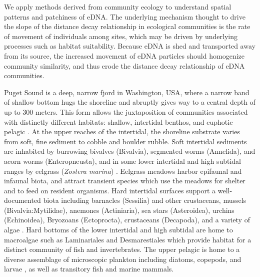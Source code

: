 \documentclass[11pt,letterpaper]{article} %
\begin{document}
We apply methods derived from community ecology to understand spatial patterns and patchiness of eDNA. The underlying mechanism thought to drive the slope of the distance decay relationship in ecological communities is the rate of movement of individuals among sites, which may be driven by underlying processes such as habitat suitability. Because eDNA is shed and transported away from its source, the increased movement of eDNA particles should homogenize community similarity, and thus erode the distance decay relationship of eDNA communities.


Puget Sound is a deep, narrow fjord in Washington, USA, where a narrow band of shallow bottom hugs the shoreline and abruptly gives way to a central depth of up to 300 meters. This form allows the juxtaposition of communities associated with distinctly different habitats: shallow, intertidal benthos, and euphotic pelagic \citep{Burns1985}. At the upper reaches of the intertidal, the shoreline substrate varies from soft, fine sediment to cobble and boulder rubble. Soft intertidal sediments are inhabited by burrowing bivalves (Bivalvia), segmented worms (Annelida), and acorn worms (Enteropneusta), and in some lower intertidal and high subtidal ranges by eelgrass (\textit{Zostera marina}) \citep{Kozloff1973, Dethier2010} . Eelgrass meadows harbor epifaunal and infaunal biota, and attract transient species which use the meadows for shelter and to feed on resident organisms. Hard intertidal surfaces support a well-documented biota including barnacles (Sessilia) and other crustaceans, mussels (Bivalvia:Mytilidae), anemones (Actiniaria), sea stars (Asteroidea), urchins (Echinoidea), Bryozoans (Ectoprocta), crustaceans (Decapoda), and a variety of algae \citep{Dethier2010}. Hard bottoms of the lower intertidal and high subtidal are home to macroalgae such as Laminariales and Desmarestiales which provide habitat for a distinct community of fish and invertebrates. The upper pelagic is home to a diverse assemblage of microscopic plankton including diatoms, copepods, and larvae \citep{Strickland1983}, as well as transitory fish and marine mammals.
\end{document}

